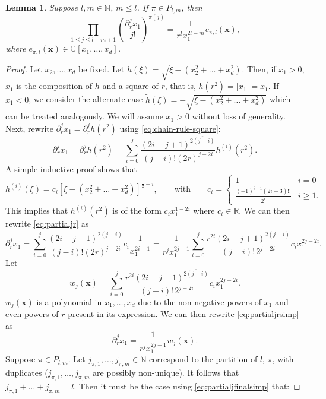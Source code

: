 \documentclass[12pt]{article}
\def\C{{\mathbb C}}
\def\N{{\mathbb N}}
\def\R{{\mathbb R}}
\let\b=\boldsymbol
\def\risingfac#1#2{\left(#1\right)^{\overline{#2}}}
\theoremstyle{definition}
\theoremstyle{plain}
\newtheorem{lemma}{Lemma}
\theoremstyle{definition}
\begin{document}
\begin{lemma}
\label{lem:dx1dr}
Suppose $l, m \in \N$, $m \leq l$. If $\pi \in P_{l,m}$, then
\[
\prod_{1 \leq j \leq l-m+1} \left( \frac{\partial^j_r x_1}{j!} \right)^{\pi(j)} = \frac{1}{r^l x_1^{2l-m}}  e_{\pi,l}(\b{x}),
\]
where $e_{\pi,l}(\b{x}) \in \C[x_1, \dots, x_d]$.
\end{lemma}
\begin{proof}
Let $x_2,\dots,x_d$ be fixed.
Let $h(\xi) = \sqrt{\xi-(x_2^2 + \dots + x_d^2)}$. Then, if $x_1 > 0$, $x_1$ is the composition of $h$ and a square of $r$, that is, $h(r^2) = |x_1| = x_1$. If $x_1 < 0$, we consider the alternate case $\tilde h(\xi) = -\sqrt{\xi-(x_2^2 + \dots + x_d^2)}$ which can be treated analogously. We will assume $x_1 > 0$ without loss of generality. Next, rewrite $\partial^j_{r} x_1 = \partial^j_{r} h(r^2)$ using \eqref{eq:chain-rule-square}:
\begin{equation}
\label{eq:partialjr}
\partial^j_{r} x_1 =\partial^j_{r} h(r^2)=\sum_{i=0}^j \frac{\risingfac{2i-j+1}{2(j-i)}}{(j-i)!(2r)^{j-2i}} h^{(i)}(r^2).
\end{equation}
A simple inductive proof shows that
\[
h^{(i)}(\xi) =c_i [\xi - (x_2^2 + \dots + x_d^2)]^{\frac{1}{2}-i},
\qquad \text{with}\qquad
c_i =\begin{cases} 1 &i=0\\
 \frac{(-1)^{i-1}(2i-3)!!}{2^i} & i \geq 1.
\end{cases}
\]
This implies that $h^{(i)}(r^2)$ is of the form $c_i x_1^{1-2i}$ where $c_i \in \R$. We can then rewrite \eqref{eq:partialjr} as
\begin{equation}
\label{eq:partialjrsimp}
\partial^j_{r} x_1  = \sum_{i=0}^j \frac{\risingfac{2i-j+1}{2(j-i)}}{(j-i)!(2r)^{j-2i}} c_i \frac{1}{x_1^{2i-1}} = \frac{1}{r^j x_1^{2j-1}}\sum_{i=0}^j \frac{r^{2i}\risingfac{2i-j+1}{2(j-i)}}{(j-i)! \, 2^{j-2i}} c_i x_1^{2j-2i}.
\end{equation}
Let
\[
w_{j}(\b{x}) = \sum_{i=0}^j \frac{r^{2i}\risingfac{2i-j+1}{2(j-i)}}{(j-i)! \, 2^{j-2i}} c_i x_1^{2j-2i}.
\]
$w_{j}(\b{x})$ is a polynomial in $x_1, \dots, x_d$ due to the non-negative powers of $x_1$ and even powers of $r$ present in its expression. We can then rewrite \eqref{eq:partialjrsimp} as
\begin{equation}
\label{eq:partialjfinalsimp}
\partial^j_{r} x_1  = \frac{1}{r^j x_1^{2j-1}} w_{j}(\b{x}).
\end{equation}
Suppose $\pi \in P_{l,m}$. Let $j_{\pi,1}, \dots, j_{\pi, m} \in \N$ correspond to the partition of $l$, $\pi$, with duplicates ($j_{\pi,1}, \dots, j_{\pi, m}$ are possibly non-unique). It follows that $j_{\pi,1} + \dots + j_{\pi,m} = l$. Then it must be the case using \eqref{eq:partialjfinalsimp} that:

\end{proof}
\end{document}
